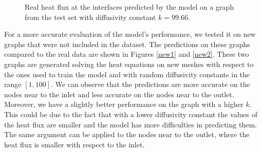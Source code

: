\documentclass[11pt,a4paper]{article}
\begin{document}
\begin{figure}[H]
    \centering
    \caption{Real heat flux at the interfaces predicted by the model on a graph from the test set with diffusivity constant \(k=99.66\).}
    \label{test}
\end{figure}

For a more accurate evaluation of the model's performance, we tested it on new graphs that were not included in the dataset. 
The predictions on these graphs compared to the real data are shown in Figures \ref{new1} and \ref{new2}. These two graphs are generated solving the heat equations on new meshes with respect to the ones used to train the model and with random diffusivity constants in the range \([1,100]\).
We can observe that the predictions are more accurate on the nodes near to the inlet and less accurate on the nodes near to the outlet. 
Moreover, we have a slightly better performance on the graph with a higher \(k\). 
This could be due to the fact that with a lower diffusivity constant the values of the heat flux are smaller and the model has more difficulties in predicting them. The same argument can be applied to the nodes near to the outlet, where the heat flux is smaller with respect to the inlet.
\end{document}

